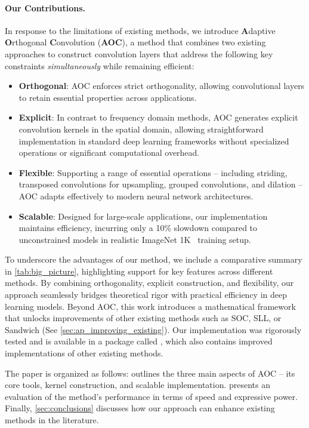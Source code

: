 \paragraph{Our Contributions.}
In response to the limitations of existing methods, we introduce \textbf{A}daptive \textbf{O}rthogonal \textbf{C}onvolution (\textbf{AOC}), a method that combines two existing approaches to construct convolution layers that address the following key constraints \textit{simultaneously} while remaining efficient:
\begin{itemize}[itemsep=7pt, topsep=5pt, parsep=0pt, partopsep=0pt]
    \item \textbf{Orthogonal}: AOC enforces strict orthogonality, allowing convolutional layers to retain essential properties across applications.     
    \item \textbf{Explicit}: In contrast to frequency domain methods, AOC generates explicit convolution kernels in the spatial domain, allowing straightforward implementation in standard deep learning frameworks without specialized operations or significant computational overhead. 
    \item \textbf{Flexible}: Supporting a range of essential operations -- including striding, transposed convolutions for upsampling, grouped convolutions, and dilation -- AOC adapts effectively to modern neural network architectures.
    \item \textbf{Scalable}: Designed for large-scale applications, our implementation maintains efficiency, incurring only a 10\% slowdown compared to unconstrained models in realistic ImageNet 1K~\cite{deng2009imagenet} training setup.
\end{itemize}
To underscore the advantages of our method, we include a comparative summary in  \cref{tab:big_picture}, highlighting support for key features across different methods.
By combining orthogonality, explicit construction, and flexibility, our approach seamlessly bridges theoretical rigor with practical efficiency in deep learning models. Beyond AOC, this work introduces a mathematical framework that unlocks improvements of other existing methods such as SOC, SLL, or Sandwich (See \cref{sec:ap_improving_existing}). Our implementation was rigorously tested and is available in a package called \fulllibname, which also contains improved implementations of other existing methods.


The paper is organized as follows:   outlines the three main aspects of AOC -- its core tools, kernel construction, and scalable implementation.  presents an evaluation of the method's performance in terms of speed and expressive power. Finally, \cref{sec:conclusions} discusses how our approach can enhance existing methods in the literature.